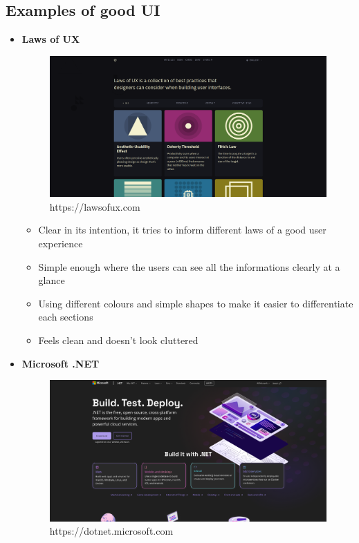 \documentclass[12pt,titlepage]{article}
\begin{document}
\subsection{Examples of good UI}
\begin{itemize}
    \item {
        \textbf{Laws of UX}
        \begin{figure}[h]
            \centering
            \includegraphics[width=.8\textwidth]{./images/law-of-ux.png}
            \caption{https://lawsofux.com}
        \end{figure}
        \begin{itemize}
            \item Clear in its intention, it tries to inform different laws of a good user experience
            \item Simple enough where the users can see all the informations clearly at a glance
            \item Using different colours and simple shapes to make it easier to differentiate each sections
            \item Feels clean and doesn't look cluttered
        \end{itemize}
    }
    \pagebreak
    \item {
        \textbf{Microsoft .NET}
        \begin{figure}[h]
            \centering
            \includegraphics[width=.8\textwidth]{./images/dotnet.png}
            \caption{https://dotnet.microsoft.com}

\end{figure}}
\end{itemize}
\end{document}
